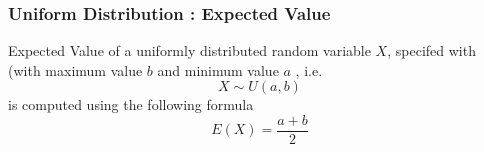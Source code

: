 \documentclass[11pt]{beamer} %
\begin{document}
\begin{frame}
\frametitle{Uniform Distribution : Expected Value}
Expected Value of a uniformly distributed random variable $X$, specifed with (with maximum value $b$ and minimum value $a$ , i.e.
\[ X \sim U(a,b) \]
is computed using the following formula
\[ E(X) = \frac{a+b}{2} \]

\end{frame}
\end{document}
